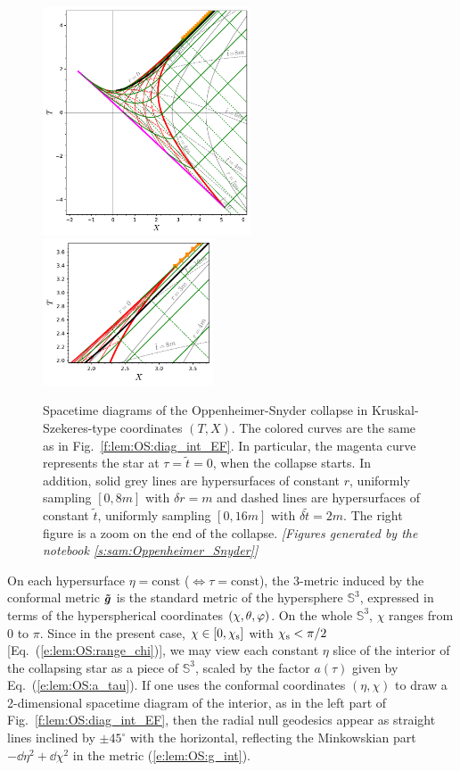 \begin{figure}
\centerline{
\includegraphics[width=0.55\textwidth]{lem_OS_diag_KS.pdf}\quad
\includegraphics[width=0.45\textwidth]{lem_OS_diag_KS_zoom.pdf}
}
\caption[]{\label{f:lem:OS:diag_KS} \footnotesize
Spacetime diagrams of the Oppenheimer-Snyder collapse
in Kruskal-Szekeres-type coordinates $(T,X)$.
The colored curves are the same as in Fig.~\ref{f:lem:OS:diag_int_EF}.
In particular, the magenta curve represents the star at $\tau = \tilde{t} = 0$,
when the collapse starts. In addition, solid grey
lines are hypersurfaces of constant $r$, uniformly sampling $[0, 8m]$
with $\delta r = m$ and dashed lines are hypersurfaces of
constant $\tilde{t}$, uniformly sampling $[0, 16m]$ with
$\delta\tilde{t} = 2 m$.
The right figure is a zoom on the end of the collapse.
\textsl{[Figures generated by the notebook \ref{s:sam:Oppenheimer_Snyder}]}
}
\end{figure}


On each hypersurface $\eta=\mathrm{const}$ ($\iff \tau = \mathrm{const}$),
the 3-metric induced by
the conformal metric $\bm{\tilde{g}}$ is the standard metric of the hypersphere
$\mathbb{S}^3$, expressed in terms of the hyperspherical coordinates $(\chi,\theta,\varphi)$.
On the whole $\mathbb{S}^3$, $\chi$ ranges from $0$ to $\pi$. Since in the
present case, $\chi \in [0,\chi_{\rm s}]$ with $\chi_{\rm s} < \pi/2$
[Eq.~(\ref{e:lem:OS:range_chi})],
we may view each constant $\eta$ slice of the interior of the collapsing
star as a piece of $\mathbb{S}^3$, scaled by the factor $a(\tau)$
given by Eq.~(\ref{e:lem:OS:a_tau}).
If one uses the conformal coordinates $(\eta,\chi)$ to draw a 2-dimensional
spacetime diagram of the interior, as in the left part of Fig.~\ref{f:lem:OS:diag_int_EF},
then the radial null geodesics appear as straight lines inclined by $\pm 45^\circ$
with the horizontal, reflecting the Minkowskian part $- \dd\eta^2 + \dd\chi^2$
in the metric (\ref{e:lem:OS:g_int}).

